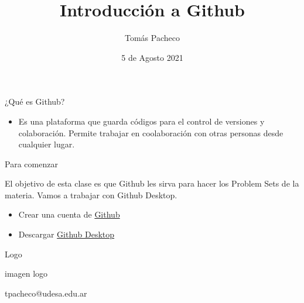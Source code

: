 \documentclass{beamer}					%
\title{Introducción a Github}
\author{Tom\'as Pacheco}
\institute{Econom\'ia Aplicada - Universidad de San Andr\'es}
\date{5 de Agosto 2021}
\begin{document}
\begin{frame}
  \titlepage
\end{frame}

\begin{frame}{¿Qué es Github?}

\begin{itemize}
    \item Es una plataforma que guarda c\'odigos para el control de versiones y colaboraci\'on. Permite trabajar en coolaboraci\'on con otras personas desde cualquier lugar. 
\end{itemize}
\end{frame}

\begin{frame}{Para comenzar}

El objetivo de esta clase es que Github les sirva para hacer los Problem Sets de la materia. Vamos a trabajar con Github Desktop.
\begin{itemize}
    \item Crear una cuenta de \href{https://bit.ly/3kuoEd4}{Github} 
    \item Descargar \href{https://desktop.github.com/}{Github Desktop}
\end{itemize}  
\end{frame}

\begin{frame}{Logo}

\begin{center}
imagen logo
\end{center}

\end{frame}



\begin{frame}{}
\begin{huge}
\begin{center}
    tpacheco@udesa.edu.ar
\end{center}
\end{huge}
\end{frame}
\end{document}
